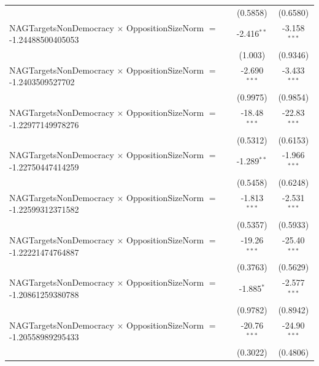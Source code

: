 \begin{tabular}{lcc}
                                                                                & (0.5858)             & (0.6580)\\   
   NAGTargetsNonDemocracy $\times$ OppositionSizeNorm $=$ -1.24488500405053     & -2.416$^{**}$        & -3.158$^{***}$\\   
                                                                                & (1.003)              & (0.9346)\\   
   NAGTargetsNonDemocracy $\times$ OppositionSizeNorm $=$ -1.2403509527702      & -2.690$^{***}$       & -3.433$^{***}$\\   
                                                                                & (0.9975)             & (0.9854)\\   
   NAGTargetsNonDemocracy $\times$ OppositionSizeNorm $=$ -1.22977149978276     & -18.48$^{***}$       & -22.83$^{***}$\\   
                                                                                & (0.5312)             & (0.6153)\\   
   NAGTargetsNonDemocracy $\times$ OppositionSizeNorm $=$ -1.22750447414259     & -1.289$^{**}$        & -1.966$^{***}$\\   
                                                                                & (0.5458)             & (0.6248)\\   
   NAGTargetsNonDemocracy $\times$ OppositionSizeNorm $=$ -1.22599312371582     & -1.813$^{***}$       & -2.531$^{***}$\\   
                                                                                & (0.5357)             & (0.5933)\\   
   NAGTargetsNonDemocracy $\times$ OppositionSizeNorm $=$ -1.22221474764887     & -19.26$^{***}$       & -25.40$^{***}$\\   
                                                                                & (0.3763)             & (0.5629)\\   
   NAGTargetsNonDemocracy $\times$ OppositionSizeNorm $=$ -1.20861259380788     & -1.885$^{*}$         & -2.577$^{***}$\\   
                                                                                & (0.9782)             & (0.8942)\\   
   NAGTargetsNonDemocracy $\times$ OppositionSizeNorm $=$ -1.20558989295433     & -20.76$^{***}$       & -24.90$^{***}$\\   
                                                                                & (0.3022)             & (0.4806)\\   

\end{tabular}
